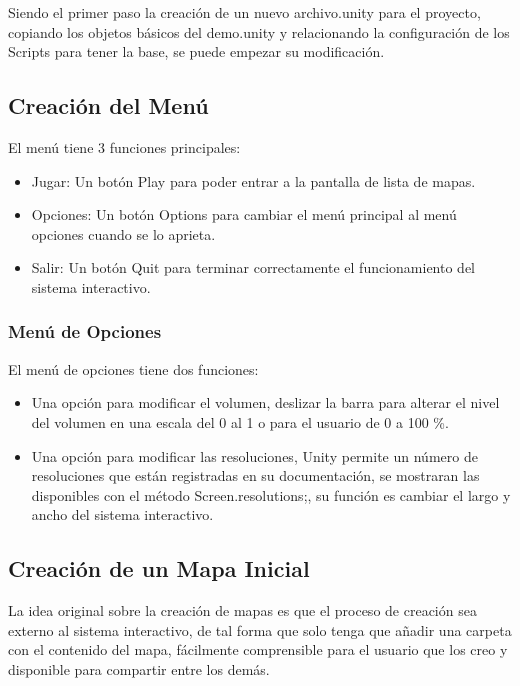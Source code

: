 Siendo el primer paso la creación de un nuevo archivo.unity para el proyecto, copiando los objetos básicos del demo.unity y relacionando la configuración de los Scripts para tener la base, se puede empezar su modificación.


\subsection{Creación del Menú}

El menú tiene 3 funciones principales:

\begin{itemize}
	\item Jugar: Un botón Play para poder entrar a la pantalla de lista de mapas.
	\item Opciones: Un botón Options para cambiar el menú principal al menú opciones cuando se lo aprieta.
	\item Salir: Un botón Quit para terminar correctamente el funcionamiento del sistema interactivo.
\end{itemize}

\subsubsection{Menú de Opciones}

El menú de opciones tiene dos funciones:
\begin{itemize}
	\item Una opción para modificar el volumen, deslizar la barra para alterar el nivel del volumen en una escala del 0 al 1 o para el usuario de 0 a 100 \%.
	\item Una opción para modificar las resoluciones, Unity permite un número de resoluciones que están registradas en su documentación, se mostraran las disponibles con el método Screen.resolutions;, su función es cambiar el largo y ancho del sistema interactivo.
\end{itemize}

\subsection{Creación de un Mapa Inicial}

La idea original sobre la creación de mapas es que el proceso de creación sea externo al sistema interactivo, de tal forma que solo tenga que añadir una carpeta con el contenido del mapa, fácilmente comprensible para el usuario que los creo y disponible para compartir entre los demás.

